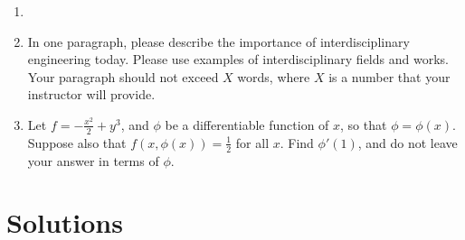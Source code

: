 \documentclass{article}
\begin{document}
\begin{enumerate}
\item %

\item In one paragraph, please describe the importance of interdisciplinary engineering today. Please use examples of interdisciplinary fields and works. Your paragraph should not exceed $X$ words, where $X$ is a number that your instructor will provide. 
\item %
Let $f=-\frac{x^2}{2}+y^3$, and $\phi$ be a differentiable function of $x$, so that $\phi = \phi(x)$. Suppose also that $f(x,\phi(x))=\frac{1}{2}$ for all $x$. Find $\phi'(1)$, and do not leave your answer in terms of $\phi$. 
\end{enumerate} %
\newpage
\section*{Solutions}
\end{document}
